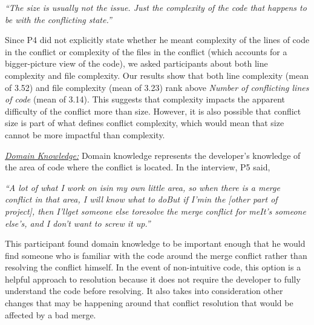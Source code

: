 \begin{displayquote}
\textit{``The size is usually not the issue. Just the complexity of the code that happens to be with the conflicting state.''}	
\end{displayquote}
Since P4 did not explicitly state whether he meant complexity of the lines of code in the conflict or complexity of the files in the conflict (which accounts for a bigger-picture view of the code), we asked participants about both line complexity and file complexity. Our results show that both line complexity (mean of 3.52) and file complexity (mean of 3.23) rank above \textit{Number of conflicting lines of code} (mean of 3.14). This suggests that complexity impacts the apparent difficulty of the conflict more than size. However, it is also possible that conflict size is part of what defines conflict complexity, which would mean that size cannot be more impactful than complexity.

\underline{\textit{Domain Knowledge:}} Domain knowledge represents the developer's knowledge of the area of code where the conflict is located. In the interview, P5 said, 

\begin{displayquote}
	\textit{``A lot of what I work on is\textellipsis in my own little area, so when there is a merge conflict in that area, I will know what to do\textellipsis But if I'm\textellipsis in the [other part of project], then I'll\textellipsis get someone else to\textellipsis resolve the merge conflict for me\textellipsis It's someone else's, and I don't want to screw it up.''}
\end{displayquote}

This participant found domain knowledge to be important enough that he would find someone who is familiar with the code around the merge conflict rather than resolving the conflict himself. In the event of non-intuitive code, this option is a helpful approach to resolution because it does not require the developer to fully understand the code before resolving. It also takes into consideration other changes that may be happening around that conflict resolution that would be affected by a bad merge.

